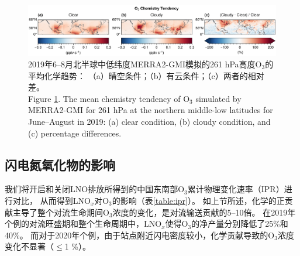 \begin{figure}[H]
    \centering
    \includegraphics[width=\textwidth]{./figures/uto3_chem_tendency.png}
    \caption{
    2019年6--8月北半球中低纬度MERRA2-GMI模拟的261 hPa高度O$_3$的平均化学趋势：
    （a）晴空条件；（b）有云条件；（c）两者的相对差。\\
    Figure \ref{fig:uto3_chem_tendency}. The mean chemistry tendency of O$_3$ simulated by MERRA2-GMI for 261 hPa at the northern middle-low latitudes for June--August in 2019:
    (a) clear condition, (b) cloudy condition, and (c) percentage differences.
    }
    \label{fig:uto3_chem_tendency}
\end{figure}

\subsection{闪电氮氧化物的影响} \label{sec:lnox_effects}

我们将开启和关闭LNO排放所得到的中国东南部O$_3$累计物理变化速率（IPR）进行对比，
从而得到LNO$_x$对O$_3$的影响（表\ref{table:ipr}）。
如上节所述，化学的正贡献主导了整个对流生命期间O$_3$浓度的变化，是对流输送贡献的5--10倍。
在2019年个例的对流旺盛期和整个生命周期中，LNO$_x$使得O$_3$的净产量分别降低了25\%和40\%。
而对于2020年个例，由于站点附近闪电密度较小，化学贡献导致的O$_3$浓度变化不显著（$\leq$1 \%）。


